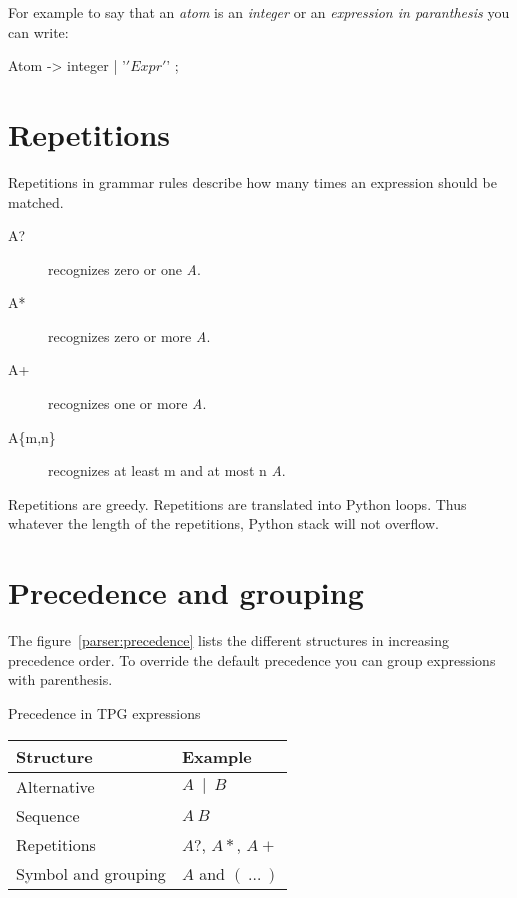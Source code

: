 For example to say that an \emph{atom} is an \emph{integer} or an \emph{expression in paranthesis}
you can write:
\begin{verbatimtab}[4]
	Atom -> integer | '\(' Expr '\)' ;
\end{verbatimtab}

\section{Repetitions}
\label{parser:repetitions}

Repetitions in grammar rules describe how many times an expression should be matched.

\begin{description}
	\item [A?] recognizes zero or one \emph{A}.
	\item [A*] recognizes zero or more \emph{A}.
	\item [A+] recognizes one or more \emph{A}.
	\item [A\{m,n\}] recognizes at least m and at most n \emph{A}.
\end{description}

Repetitions are greedy.
Repetitions are translated into Python loops.
Thus whatever the length of the repetitions, Python stack will not overflow. 

\section{Precedence and grouping}

The figure~\ref{parser:precedence} lists the different structures in increasing precedence order.
To override the default precedence you can group expressions with parenthesis.

\begin{tableau}
\caption{Precedence in TPG expressions} \label{parser:precedence}
\begin{tabular}{| l | l |}
\hline
	Structure			& Example \\
\hline
\hline
	Alternative			& $A~\mid~B$ \\
\hline
	Sequence			& $A~B$ \\
\hline
	Repetitions			& $A?$, $A*$, $A+$ \\
\hline
	Symbol and grouping	& $A$ and $(~\ldots~)$ \\
\hline
\end{tabular}
\end{tableau}

